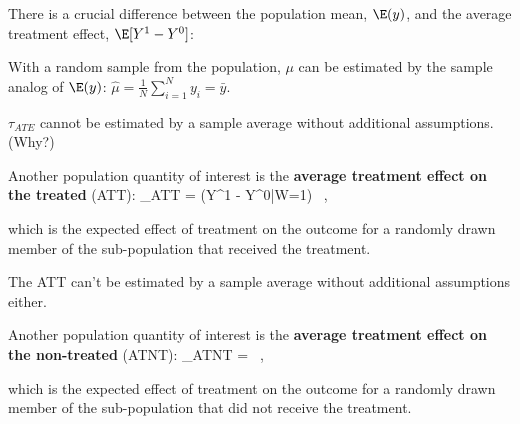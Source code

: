 \documentclass[
  25pt,         %
  a4paper,
  landscape,
  Screen4to3,
  footrule ]{foils}
\newcommand{\xx}{\item[{\small $\bullet$}]}
\begin{document}
\vsm

\x There is a crucial difference between the population mean,
$\E(y)$, and the average treatment effect, $\E[Y^1-Y^0]$:
    \bi
    \xx With a random sample from the population, $\mu$ can be estimated
    by the sample analog of $\E(y)$: $\widehat{\mu} = \frac{1}{N} \sum_{i=1}^N y_i = \bar{y}$.
    \vs
    \xx $\tau_{ATE}$ cannot be estimated by a sample average without
    additional assumptions. (Why?)
    \ei

\ei



\bi

\x Another population quantity of interest is the \textbf{average
treatment effect on the treated} (ATT):
    \vsm
    \bdm
    \tau_{ATT} = \E(Y^1 - Y^0|W=1) \, ,
    \edm

\vsm \vsm

which is the expected effect of treatment on the outcome for a
randomly drawn member of the sub-population that received the
treatment.

\vsm

\x The ATT can't be estimated by a sample
average without additional assumptions either.

\ei


\bi

\x Another population quantity of interest is the \textbf{average
treatment effect on the non-treated} (ATNT):
    \vsm
    \bdm
    \tau_{ATNT} = \E[Y^1 - Y^0|W=0] \, ,
    \edm

\vsm \vsm

which is the expected effect of treatment on the outcome for a
randomly drawn member of the sub-population that did not receive the
treatment.

\ei

\end{document}
